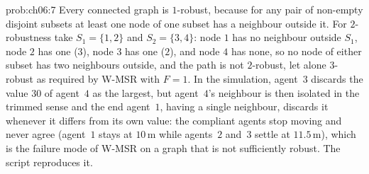 \begin{sol}{prob:ch06:7}
Every connected graph is $1$-robust, because for any pair of non-empty disjoint subsets at least one node of one subset has a neighbour outside it. For $2$-robustness take $S_1=\{1,2\}$ and $S_2=\{3,4\}$: node $1$ has no neighbour outside $S_1$, node $2$ has one ($3$), node $3$ has one ($2$), and node $4$ has none, so no node of either subset has two neighbours outside, and the path is not $2$-robust, let alone $3$-robust as required by W-MSR with $F=1$. In the simulation, agent~$3$ discards the value $30$ of agent~$4$ as the largest, but agent~$4$'s neighbour is then isolated in the trimmed sense and the end agent~$1$, having a single neighbour, discards it whenever it differs from its own value: the compliant agents stop moving and never agree (agent~$1$ stays at $10$\,m while agents~$2$ and~$3$ settle at $11.5$\,m), which is the failure mode of W-MSR on a graph that is not sufficiently robust. The script  reproduces it.
\end{sol}

